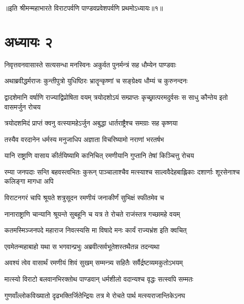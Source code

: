 ॥इति श्रीमन्महाभारते विराटपर्वणि पाण्डवप्रवेशपर्वणि प्रथमोऽध्यायः॥१॥

\chapter{अध्यायः २}

\twolineshloka
{निवृत्तवनवासास्ते सत्यसन्धा मनस्विनः}
{अकुर्वत पुनर्मन्त्रं सह धौम्येन पाण्डवाः}


\twolineshloka
{अथाब्रवीद्धर्मराजः कुन्तीपुत्रो युधिष्ठिरः}
{भ्रातॄन्कृष्णां च सङ्ग्रेक्ष्य धौम्यं च कुरुनन्दनः}


\threelineshloka
{द्वादशेमानि वर्षाणि राज्याद्विप्रोषिता वयम्}
{त्रयोदशोऽयं सम्प्राप्तः कृच्छ्रात्परमदुर्वसः}
{स साधु कौन्तेय इतो वासमर्जुन रोचय}


\twolineshloka
{त्रयोदशमिदं प्राप्तं क्वनु वत्स्यामहेऽर्जुन}
{अबुद्धा धार्तराष्ट्रैश्च समग्राः सह कृष्णया}




\twolineshloka
{तस्यैव वरदानेन धर्मस्य मनुजाधिप}
{अज्ञाता विचरिष्यामो नराणां भरतर्षभ}


\twolineshloka
{यानि राष्ट्राणि वासाय कीर्तयिष्यामि कानिचित्}
{रमणीयानि गुप्तानि तेषां किञ्चित्तु रोचय}


\threelineshloka
{रम्या जनपदाः सन्ति बहवस्त्वभितः कुरून्}
{पाञ्चालाश्चैव मत्स्याश्च साल्ववैदेहबाह्लिकाः}
{दशार्णाः शूरसेनाश्च कलिङ्गा मागधा अपि}


\twolineshloka
{विराटनगरं चापि श्रूयते शत्रुसूदन}
{रमणीयं जनाकीर्णं सुभिक्षं स्फीतमेव च}


\twolineshloka
{नानाराष्ट्राणि चान्यानि श्रूयन्ते सुबहूनि च}
{यत्र ते रोचते राजंस्तत्र गच्छामहे वयम्}


\twolineshloka
{कतमस्मिञ्जनपदे महाराज निवत्स्यसि}
{मा विषादे मनः कार्यं राज्यभ्रंश इति क्वचित्}




\twolineshloka
{एवमेतन्महाबाहो यथा स भगवान्प्रभुः}
{अब्रवीत्सर्वभूतेशस्तथैतन्न तदन्यथा}


\twolineshloka
{अवश्यं त्वेव वासार्थं रमणीयं शिवं सुखम्}
{सम्मन्त्र्य सहितैः सर्वैर्द्रष्टव्यमकुतोऽभयम्}


\twolineshloka
{मात्स्यो विराटो बलवानभिरक्तोथ पाण्डवान्}
{धर्मशीलो वदान्यश्च वृद्धः सत्स्वपि सम्मतः}


\twolineshloka
{गुणवाँल्लोकविख्यातो दृढभक्तिर्जितेन्द्रियः}
{तत्र मे रोचते पार्थ मत्स्यराजान्तिकेऽनघ}


